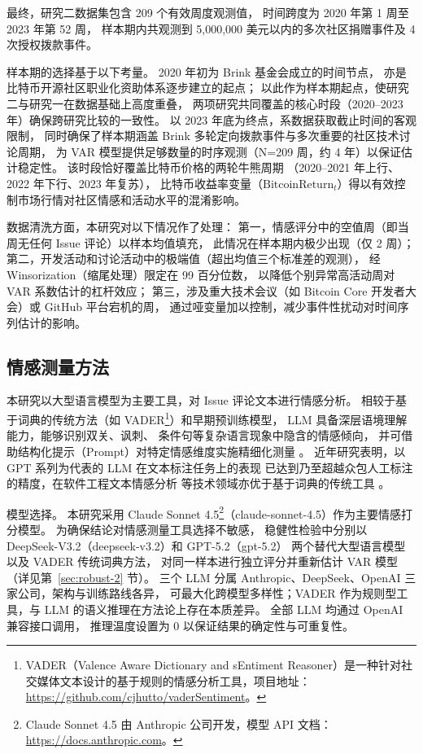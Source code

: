 最终，研究二数据集包含 209 个有效周度观测值，
时间跨度为 2020 年第 1 周至 2023 年第 52 周，
样本期内共观测到 5,000,000 美元以内的多次社区捐赠事件及 4 次授权拨款事件。

样本期的选择基于以下考量。
2020 年初为 Brink 基金会成立的时间节点，
亦是比特币开源社区职业化资助体系逐步建立的起点；
以此作为样本期起点，使研究二与研究一在数据基础上高度重叠，
两项研究共同覆盖的核心时段（2020--2023 年）确保跨研究比较的一致性。
以 2023 年底为终点，系数据获取截止时间的客观限制，
同时确保了样本期涵盖 Brink 多轮定向拨款事件与多次重要的社区技术讨论周期，
为 VAR 模型提供足够数量的时序观测（N=209 周，约 4 年）以保证估计稳定性。
该时段恰好覆盖比特币价格的两轮牛熊周期
（2020--2021 年上行、2022 年下行、2023 年复苏），
比特币收益率变量（$\text{BitcoinReturn}_t$）得以有效控制市场行情对社区情感和活动水平的混淆影响。

数据清洗方面，本研究对以下情况作了处理：
第一，情感评分中的空值周（即当周无任何 Issue 评论）以样本均值填充，
此情况在样本期内极少出现（仅 2 周）；
第二，开发活动和讨论活动中的极端值（超出均值三个标准差的观测），
经 Winsorization（缩尾处理）限定在 99 百分位数，
以降低个别异常高活动周对 VAR 系数估计的杠杆效应；
第三，涉及重大技术会议（如 Bitcoin Core 开发者大会）或 GitHub 平台宕机的周，
通过哑变量加以控制，减少事件性扰动对时间序列估计的影响。

\subsection{情感测量方法}

本研究以大型语言模型为主要工具，对 Issue 评论文本进行情感分析。
相较于基于词典的传统方法（如 VADER\footnote{VADER（Valence Aware Dictionary and sEntiment Reasoner）是一种针对社交媒体文本设计的基于规则的情感分析工具，项目地址：\url{https://github.com/cjhutto/vaderSentiment}。}）和早期预训练模型，
LLM 具备深层语境理解能力，能够识别双关、讽刺、
条件句等复杂语言现象中隐含的情感倾向，
并可借助结构化提示（Prompt）对特定情感维度实施精细化测量
\cite{gilardi2023chatgpt}。
近年研究表明，以 GPT 系列为代表的 LLM 在文本标注任务上的表现
已达到乃至超越众包人工标注的精度，在软件工程文本情感分析
等技术领域亦优于基于词典的传统工具
\cite{zhang2020sentiment}。

模型选择。
本研究采用 Claude Sonnet 4.5\footnote{Claude Sonnet 4.5 由 Anthropic 公司开发，模型 API 文档：\url{https://docs.anthropic.com}。}（claude-sonnet-4.5）作为主要情感打分模型。
为确保结论对情感测量工具选择不敏感，
稳健性检验中分别以 DeepSeek-V3.2（deepseek-v3.2）和 GPT-5.2（gpt-5.2）
两个替代大型语言模型以及 VADER 传统词典方法，
对同一样本进行独立评分并重新估计 VAR 模型（详见第~\ref{sec:robust-2} 节）。
三个 LLM 分属 Anthropic、DeepSeek、OpenAI 三家公司，架构与训练路线各异，
可最大化跨模型多样性；VADER 作为规则型工具，与 LLM 的语义推理在方法论上存在本质差异。
全部 LLM 均通过 OpenAI 兼容接口调用，
推理温度设置为 0 以保证结果的确定性与可重复性。

